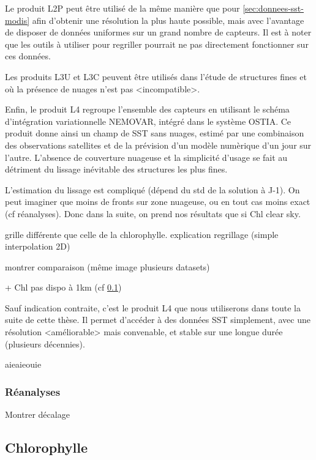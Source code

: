\documentclass[index]{subfiles}
\begin{document}
Le produit L2P peut être utilisé de la même manière que pour \cref{sec:donnees-sst-modis} afin d'obtenir une résolution la plus haute possible, mais avec l'avantage de disposer de données uniformes sur un grand nombre de capteurs.
Il est à noter que les outils à utiliser pour regriller pourrait ne pas directement fonctionner sur ces données.

Les produits L3U et L3C peuvent être utilisés dans l'étude de structures fines et où la présence de nuages n'est pas <incompatible>.

Enfin, le produit L4 regroupe l'ensemble des capteurs en utilisant le schéma d'intégration variationnelle \gls{NEMOVAR}, intégré dans le système \gls{OSTIA}.
Ce produit donne ainsi un champ de \gls{SST} sans nuages, estimé par une combinaison des observations satellites et de la prévision d'un modèle numèrique d'un jour sur l'autre.
L'absence de couverture nuageuse et la simplicité d'usage se fait au détriment du lissage inévitable des structures les plus fines.

L'estimation du lissage est compliqué (dépend du std de la solution à J-1).
On peut imaginer que moins de fronts sur zone nuageuse, ou en tout cas moins exact (cf réanalyses).
Donc dans la suite, on prend nos résultats que si Chl clear sky.

grille différente que celle de la chlorophylle.
explication regrillage (simple interpolation 2D)

montrer comparaison (même image plusieurs datasets)

+ Chl pas dispo à 1km
(cf \cref{sec:donnees-chl})

Sauf indication contraite, c'est le produit L4 que nous utiliserons dans toute la suite de cette thèse.
Il permet d'accéder à des données \gls{SST} simplement, avec une résolution <améliorable> mais convenable, et stable sur une longue durée (plusieurs décennies).

aieaieouie

\subsubsection{Réanalyses}
\label{sec:donnees-sst-reanalyses}

Montrer décalage

\subsection{Chlorophylle}
\label{sec:donnees-chl}
\end{document}
